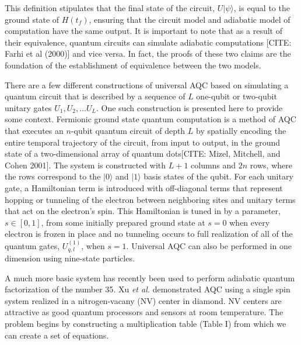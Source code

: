 \documentclass[%
 reprint,
 amsmath,amssymb,
 aps,
]{revtex4-1}
\begin{document}
   This definition stipulates that the final state of the circuit, $U\vert\psi\rangle$, is equal to the ground state of $H(t_f)$, ensuring that the circuit model and adiabatic model of computation have the same output. It is important to note that as a result of their equivalence, quantum circuits can simulate adiabatic computations [CITE: Farhi et al (2000)]  and vice versa\cite{Aharanov2007}. In fact, the proofs of these two claims are the foundation of the establishment of equivalence between the two models.
   
   There are a few different constructions of universal AQC based on simulating a quantum circuit that is described by a sequence of $L$ one-qubit or two-qubit unitary gates $U_1 , U_2 , ... U_L$. One such construction is presented here to provide some context. Fermionic ground state quantum computation is a method of AQC that executes an $n$-qubit quantum circuit of depth $L$ by spatially encoding the entire temporal trajectory of the circuit, from input to output, in the ground state of a two-dimensional array of quantum dots[CITE: Mizel, Mitchell, and Cohen 2001]. The system is constructed with $L+1$ columns and $2n$ rows, where the rows correspond to the $\vert 0 \rangle$ and $\vert 1 \rangle$ basis states of the qubit. For each unitary gate, a Hamiltonian term is introduced with off-diagonal terms that represent hopping or tunneling of the electron between neighboring sites and unitary terms that act on the electron's spin. This Hamiltonian is tuned in by a parameter, $s \in [0,1]$, from some initially prepared ground state at $s=0$ when every electron is frozen in place and no tunneling occurs to full realization of all of the quantum gates, $U^{(1)}_{q,l}$, when $s=1$. Universal AQC can also be performed in one dimension using nine-state particles\cite{Aharonov2009}. 
   
   A much more basic system has recently been used to perform adiabatic quantum factorization of the number 35\cite{Xu2017}. Xu \textit{et al.} demonstrated AQC using a single spin system realized in a nitrogen-vacany (NV) center in diamond. NV centers are attractive as good quantum processors and sensors at room temperature\cite{DOHERTY20131}. The problem begins by constructing a multiplication table (Table I) from which we can create a set of equations.
   
\end{document}
